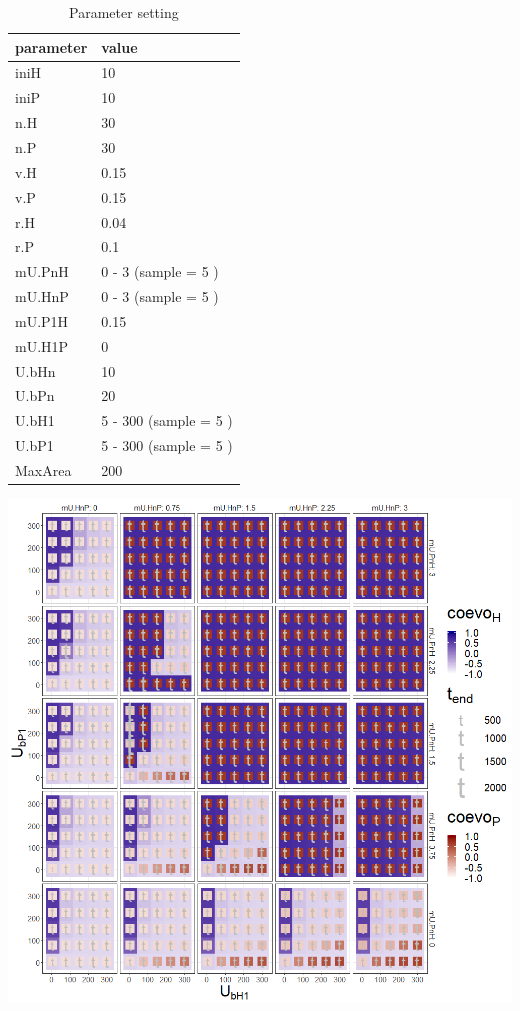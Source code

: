 \documentclass[]{book}
\begin{document}
\begin{table}[!h]

\caption{\label{tab:4Ub1mUntablepdf}Parameter setting}
\centering
\begin{tabular}{l|l}
\hline
parameter & value\\
\hline
iniH & 10\\
\hline
iniP & 10\\
\hline
n.H & 30\\
\hline
n.P & 30\\
\hline
v.H & 0.15\\
\hline
v.P & 0.15\\
\hline
r.H & 0.04\\
\hline
r.P & 0.1\\
\hline
mU.PnH & 0 - 3 (sample = 5 )\\
\hline
mU.HnP & 0 - 3 (sample = 5 )\\
\hline
mU.P1H & 0.15\\
\hline
mU.H1P & 0\\
\hline
U.bHn & 10\\
\hline
U.bPn & 20\\
\hline
U.bH1 & 5 - 300 (sample = 5 )\\
\hline
U.bP1 & 5 - 300 (sample = 5 )\\
\hline
MaxArea & 200\\
\hline
\end{tabular}
\end{table}

\newpage

\includegraphics[width=1\linewidth]{plots/4_fourPar-U.b1-mUn_plot}
\end{document}
